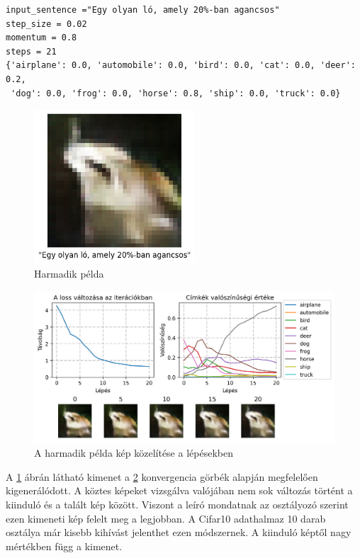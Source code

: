 \begin{verbatim}
input_sentence ="Egy olyan ló, amely 20%-ban agancsos"
step_size = 0.02
momentum = 0.8
steps = 21
{'airplane': 0.0, 'automobile': 0.0, 'bird': 0.0, 'cat': 0.0, 'deer': 0.2,
 'dog': 0.0, 'frog': 0.0, 'horse': 0.8, 'ship': 0.0, 'truck': 0.0}
\end{verbatim}

\begin{figure}[h]
	\centering
	\includegraphics[width=6cm]{images/demo03.png}
	\caption{Harmadik példa}
	\label{fig:demo3}
\end{figure}

\begin{figure}[h]
	\centering
	\includegraphics[width=15cm]{images/demo03_conv.png}
	\caption{A harmadik példa kép közelítése a lépésekben}
	\label{fig:demo3_convergence}
\end{figure}

A \ref{fig:demo3} ábrán látható kimenet a \ref{fig:demo3_convergence} konvergencia görbék alapján megfelelően kigenerálódott. A köztes képeket vizsgálva valójában nem sok változás történt a kiinduló és a talált kép között. Viszont a leíró mondatnak az osztályozó szerint ezen kimeneti kép felelt meg a legjobban. A Cifar10 adathalmaz 10 darab osztálya már kisebb kihívást jelenthet ezen módszernek. A kiinduló képtől nagy mértékben függ a kimenet.

